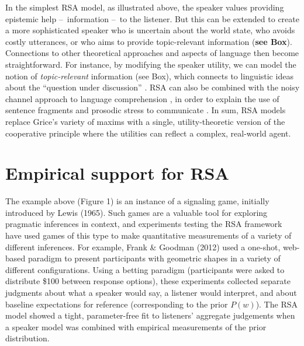 \documentclass[]{elsarticle}
\begin{document}
In the simplest RSA model, as illustrated above, the speaker values
providing epistemic help --~information --~to the listener. But this can
be extended to create a more sophisticated speaker who is uncertain
about the world state, who avoids costly utterances, or who aims to
provide topic-relevant information (\textbf{see Box}). Connections to
other theoretical approaches and aspects of language then become
straightforward. For instance, by modifying the speaker utility, we can
model the notion of \emph{topic-relevant} information (see Box), which
connects to linguistic ideas about the ``question under discussion''
\cite{Roberts}. RSA can also be combined with the noisy
channel approach to language comprehension \cite{levy},
in order to explain the use of sentence fragments and prosodic stress to
communicate \cite{bergengoodman}. In sum, RSA models
replace Grice's variety of maxims with a single, utility-theoretic
version of the cooperative principle where the utilities can reflect a
complex, real-world agent.

\section{Empirical support for RSA }\label{empirical-support-for-rsa}

The example above (Figure 1) is an instance of a signaling game,
initially introduced by Lewis (1965). Such games are a valuable tool for
exploring pragmatic inferences in context, and experiments testing the
RSA framework have used games of this type to make quantitative
measurements of a variety of different inferences. For example, Frank \&
Goodman (2012) used a one-shot, web-based paradigm to present
participants with geometric shapes in a variety of different
configurations. Using a betting paradigm (participants were asked to
distribute \$100 between response options), these experiments collected
separate judgments about what a speaker would say, a listener would
interpret, and about baseline expectations for reference (corresponding
to the prior $P(w)$). The RSA model showed a tight, parameter-free fit
to listeners' aggregate judgements when a speaker model was combined
with empirical measurements of the prior distribution.
\end{document}
